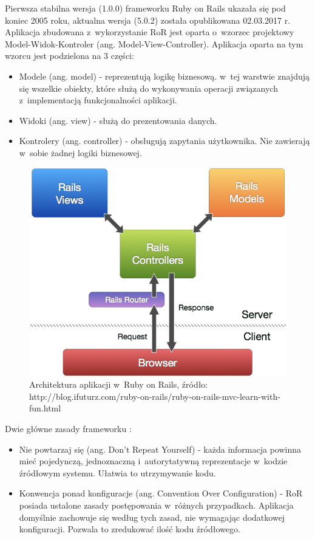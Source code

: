 \documentclass[printmode]{mgr}
\begin{document}
Pierwsza stabilna wersja (1.0.0) frameworku Ruby on Rails ukazała się pod koniec 2005 roku, aktualna wersja (5.0.2) została opublikowana 02.03.2017 r. Aplikacja zbudowana z~wykorzystanie RoR jest oparta o~wzorzec projektowy Model-Widok-Kontroler \cite{rails_agile} (ang. Model-View-Controller). Aplikacja oparta na tym wzorcu jest podzielona na 3 części:
\begin{itemize}
  \item Modele (ang. model) - reprezentują logikę biznesową. w~tej warstwie znajdują się wszelkie obiekty, które służą do wykonywania operacji związanych z~implementacją funkcjonalności aplikacji.
  \item Widoki (ang. view) - służą do prezentowania danych. 
  \item Kontrolery (ang. controller) - obsługują zapytania użytkownika. Nie zawierają w~sobie żadnej logiki biznesowej.
\end{itemize}

\begin{figure}[H]
  \centering
  \includegraphics[width=1\linewidth]{pictures/rails_mvc}
  \caption{Architektura aplikacji w~Ruby on Rails, źródło: http://blog.ifuturz.com/ruby-on-rails/ruby-on-rails-mvc-learn-with-fun.html}
  \label{fig:rails_mvc}
\end{figure}
\newpage
Dwie główne zasady frameworku \cite{doc_rails}:

\begin{itemize}
  \item Nie powtarzaj się (ang. Don't Repeat Yourself) - każda informacja powinna mieć pojedynczą, jednoznaczną i~autorytatywną reprezentacje w~kodzie źródłowym systemu. Ułatwia to utrzymywanie kodu.
  \item Konwencja ponad konfiguracje (ang. Convention Over Configuration) - RoR posiada ustalone zasady postępowania w~różnych przypadkach. Aplikacja domyślnie zachowuje się według tych zasad, nie wymagając dodatkowej konfiguracji. Pozwala to zredukować ilość kodu źródłowego.
\end{itemize}
\end{document}
